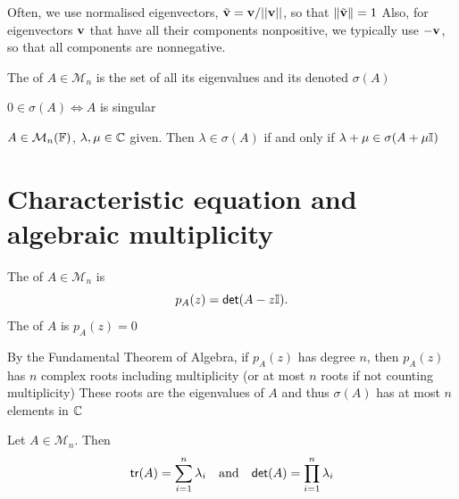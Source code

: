 \documentclass[aspectratio=169]{beamer}
\begin{document}
\begin{frame}
Often, we use normalised eigenvectors, $\tilde{\mathbf{v}}=\mathbf{v}/||\mathbf{v}||$, so that $\|\tilde{\mathbf{v}}\|=1$
\vfill
Also, for eigenvectors $\mathbf{v}$ that have all their components nonpositive, we typically use $-\mathbf{v}$, so that all components are nonnegative.
\end{frame}


\begin{frame}
\begin{definition}
  The  of $A\in \mathcal{M}_n$ is the set of all its eigenvalues and its denoted $\sigma(A)$
\end{definition}
\vfill
\begin{theorem}
$0\in \sigma(A)\iff A$ is singular
\end{theorem}
\vfill
\begin{theorem}\label{th:spectrum_shift}
$A\in \mathcal{M}_{n}(\mathbb{F})$, $\lambda, \mu \in \mathbb{C}$ given. Then 
$\lambda\in \sigma(A)$ if and only if $\lambda+\mu \in \sigma(A+\mu\mathbb{I})$
\end{theorem}
\end{frame}


\section{Characteristic equation and algebraic multiplicity}

\begin{frame}
\begin{definition}
The  of $A\in \mathcal{M}_n$ is 
\[p_A(z)= \mathsf{det}(A-z\mathbb{I}).\]
The  of $A$ is $p_A(z)=0$
\end{definition}
\vfill
By the Fundamental Theorem of Algebra, if $p_A(z)$ has degree $n$, then $p_A(z)$ has $n$ complex roots including multiplicity (or at most $n$ roots if not counting multiplicity)
\vfill
These roots are the eigenvalues of $A$ and thus $\sigma(A)$ has at most $n$ elements in $\mathbb{C}$
\end{frame}


\begin{frame}
\begin{theorem}
Let $A\in \mathcal{M}_n$. Then 
\[
\mathsf{tr}(A)= \sum\limits_{i=1}^n \lambda_i 
\quad\textrm{and}\quad 
\mathsf{det}(A)= \prod\limits_{i=1}^n \lambda_i
\]
\end{theorem}   
\end{frame}
\end{document}
